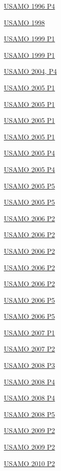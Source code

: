 \hyperref  [problem:USAMO 1996 P4]{USAMO 1996 P4}

\hyperref  [problem:USAMO 1998]{USAMO 1998}

\hyperref  [problem:USAMO 1999 P1]{USAMO 1999 P1}

\hyperref  [problem:USAMO 1999 P1]{USAMO 1999 P1}

\hyperref  [problem:USAMO 2004, P4]{USAMO 2004, P4}

\hyperref  [problem:USAMO 2005 P1]{USAMO 2005 P1}

\hyperref  [problem:USAMO 2005 P1]{USAMO 2005 P1}

\hyperref  [problem:USAMO 2005 P1]{USAMO 2005 P1}

\hyperref  [problem:USAMO 2005 P1]{USAMO 2005 P1}

\hyperref  [problem:USAMO 2005 P4]{USAMO 2005 P4}

\hyperref  [problem:USAMO 2005 P4]{USAMO 2005 P4}

\hyperref  [problem:USAMO 2005 P5]{USAMO 2005 P5}

\hyperref  [problem:USAMO 2005 P5]{USAMO 2005 P5}

\hyperref  [problem:USAMO 2006 P2]{USAMO 2006 P2}

\hyperref  [problem:USAMO 2006 P2]{USAMO 2006 P2}

\hyperref  [problem:USAMO 2006 P2]{USAMO 2006 P2}

\hyperref  [problem:USAMO 2006 P2]{USAMO 2006 P2}

\hyperref  [problem:USAMO 2006 P2]{USAMO 2006 P2}

\hyperref  [problem:USAMO 2006 P5]{USAMO 2006 P5}

\hyperref  [problem:USAMO 2006 P5]{USAMO 2006 P5}

\hyperref  [problem:USAMO 2007 P1]{USAMO 2007 P1}

\hyperref  [problem:USAMO 2007 P2]{USAMO 2007 P2}

\hyperref  [problem:USAMO 2008 P3]{USAMO 2008 P3}

\hyperref  [problem:USAMO 2008 P4]{USAMO 2008 P4}

\hyperref  [problem:USAMO 2008 P4]{USAMO 2008 P4}

\hyperref  [problem:USAMO 2008 P5]{USAMO 2008 P5}

\hyperref  [problem:USAMO 2009 P2]{USAMO 2009 P2}

\hyperref  [problem:USAMO 2009 P2]{USAMO 2009 P2}

\hyperref  [problem:USAMO 2010 P2]{USAMO 2010 P2}

